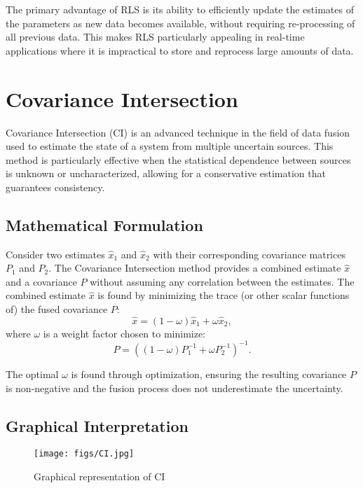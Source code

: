 \documentclass[12pt,a4paper,oneside,onecolumn]{book}
\begin{document}
The primary advantage of RLS is its ability to efficiently update the estimates of the parameters as new data becomes available, without requiring re-processing of all previous data. This makes RLS particularly appealing in real-time applications where it is impractical to store and reprocess large amounts of data.



\chapter{Covariance Intersection}

Covariance Intersection (CI) is an advanced technique in the field of data fusion used to estimate the state of a system from multiple uncertain sources. This method is particularly effective when the statistical dependence between sources is unknown or uncharacterized, allowing for a conservative estimation that guarantees consistency.

\section{Mathematical Formulation}

Consider two estimates \( \hat{x}_1 \) and \( \hat{x}_2 \) with their corresponding covariance matrices \( P_1 \) and \( P_2 \). The Covariance Intersection method provides a combined estimate \( \hat{x} \) and a covariance \( P \) without assuming any correlation between the estimates. The combined estimate \( \hat{x} \) is found by minimizing the trace (or other scalar functions of) the fused covariance \( P \):
\[ \hat{x} = (1 - \omega) \hat{x}_1 + \omega \hat{x}_2, \]
where \( \omega \) is a weight factor chosen to minimize:
\[ P = ((1 - \omega)P_1^{-1} + \omega P_2^{-1})^{-1}. \]

The optimal \( \omega \) is found through optimization, ensuring the resulting covariance \( P \) is non-negative and the fusion process does not underestimate the uncertainty.


\section{Graphical Interpretation}

\begin{figure}[H]
    \centering
    \texttt{[image: figs/CI.jpg]}
    \caption{Graphical representation of CI}
\end{figure}
\end{document}
